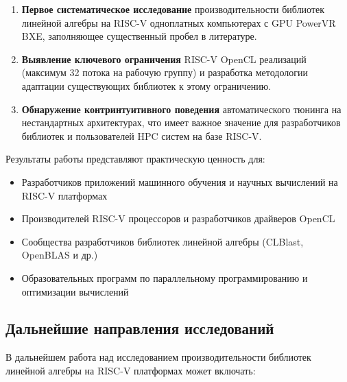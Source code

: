 \begin{enumerate}
    \item \textbf{Первое систематическое исследование} производительности библиотек линейной алгебры на RISC-V одноплатных компьютерах с GPU PowerVR BXE, заполняющее существенный пробел в литературе.
    
    \item \textbf{Выявление ключевого ограничения} RISC-V OpenCL реализаций (максимум 32 потока на рабочую группу) и разработка методологии адаптации существующих библиотек к этому ограничению.
    
    \item \textbf{Обнаружение контринтуитивного поведения} автоматического тюнинга на нестандартных архитектурах, что имеет важное значение для разработчиков библиотек и пользователей HPC систем на базе RISC-V.
\end{enumerate}

Результаты работы представляют практическую ценность для:
\begin{itemize}
    \item Разработчиков приложений машинного обучения и научных вычислений на RISC-V платформах
    \item Производителей RISC-V процессоров и разработчиков драйверов OpenCL
    \item Сообщества разработчиков библиотек линейной алгебры (CLBlast, OpenBLAS и др.)
    \item Образовательных программ по параллельному программированию и оптимизации вычислений
\end{itemize}

\subsection*{Дальнейшие направления исследований}

В дальнейшем работа над исследованием производительности библиотек линейной алгебры на RISC-V платформах может включать:

